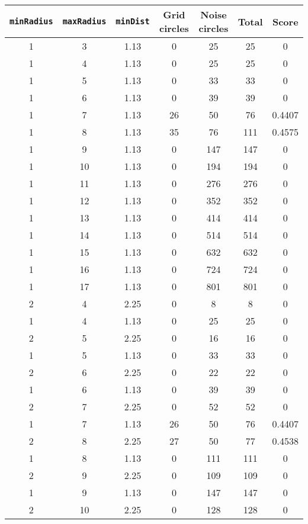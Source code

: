 \documentclass[letterpaper, 12pt]{article}
\begin{document}
\begin{longtable}{|c|c|c|c|c|c|c|}
\hline
\textbf{\texttt{minRadius}} & \textbf{\texttt{maxRadius}} & \textbf{\texttt{minDist}} & \textbf{Grid circles} & \textbf{Noise circles} & \textbf{Total} & \textbf{Score} \\
\hline
1 & 3 & 1.13 & 0 & 25 & 25 & 0 \\
\hline
1 & 4 & 1.13 & 0 & 25 & 25 & 0 \\
\hline
1 & 5 & 1.13 & 0 & 33 & 33 & 0 \\
\hline
1 & 6 & 1.13 & 0 & 39 & 39 & 0 \\
\hline
1 & 7 & 1.13 & 26 & 50 & 76 & 0.4407 \\
\hline
1 & 8 & 1.13 & 35 & 76 & 111 & 0.4575 \\
\hline
1 & 9 & 1.13 & 0 & 147 & 147 & 0 \\
\hline
1 & 10 & 1.13 & 0 & 194 & 194 & 0 \\
\hline
1 & 11 & 1.13 & 0 & 276 & 276 & 0 \\
\hline
1 & 12 & 1.13 & 0 & 352 & 352 & 0 \\
\hline
1 & 13 & 1.13 & 0 & 414 & 414 & 0 \\
\hline
1 & 14 & 1.13 & 0 & 514 & 514 & 0 \\
\hline
1 & 15 & 1.13 & 0 & 632 & 632 & 0 \\
\hline
1 & 16 & 1.13 & 0 & 724 & 724 & 0 \\
\hline
1 & 17 & 1.13 & 0 & 801 & 801 & 0 \\
\hline
2 & 4 & 2.25 & 0 & 8 & 8 & 0 \\
\hline
1 & 4 & 1.13 & 0 & 25 & 25 & 0 \\
\hline
2 & 5 & 2.25 & 0 & 16 & 16 & 0 \\
\hline
1 & 5 & 1.13 & 0 & 33 & 33 & 0 \\
\hline
2 & 6 & 2.25 & 0 & 22 & 22 & 0 \\
\hline
1 & 6 & 1.13 & 0 & 39 & 39 & 0 \\
\hline
2 & 7 & 2.25 & 0 & 52 & 52 & 0 \\
\hline
1 & 7 & 1.13 & 26 & 50 & 76 & 0.4407 \\
\hline
2 & 8 & 2.25 & 27 & 50 & 77 & 0.4538 \\
\hline
1 & 8 & 1.13 & 0 & 111 & 111 & 0 \\
\hline
2 & 9 & 2.25 & 0 & 109 & 109 & 0 \\
\hline
1 & 9 & 1.13 & 0 & 147 & 147 & 0 \\
\hline
2 & 10 & 2.25 & 0 & 128 & 128 & 0 \\

\end{longtable}
\end{document}
